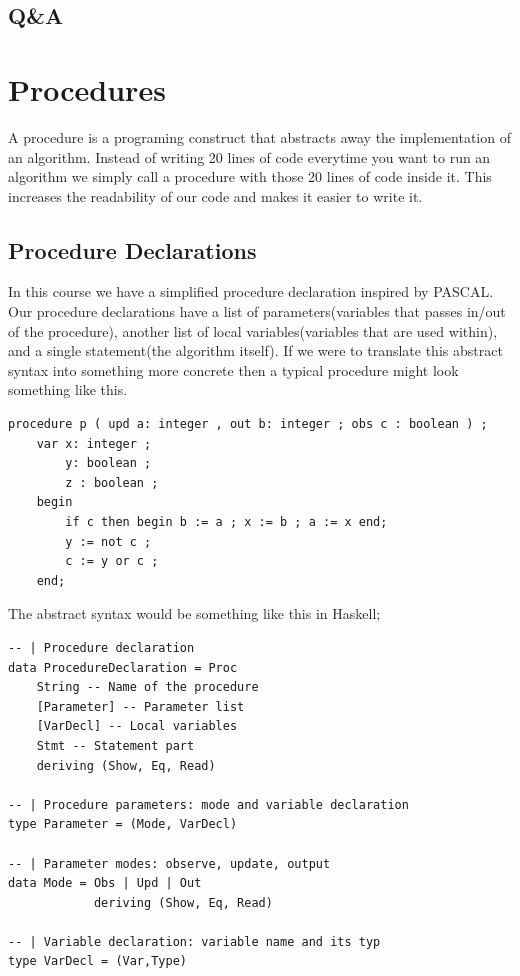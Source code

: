 \documentclass{article}
\begin{document}
        \subsection{Q\&A}

    \section{Procedures}
    A procedure is a programing construct that abstracts away the implementation of an algorithm. Instead of writing 20 lines of code 
    everytime you want to run an algorithm we simply call a procedure with those 20 lines of code inside it. This increases the readability 
    of our code and makes it easier to write it. 
    \subsection{Procedure Declarations}
    In this course we have a simplified procedure declaration inspired by PASCAL. Our procedure declarations have a list of 
    parameters(variables that passes in/out of the procedure), another list of local variables(variables that are used within), 
    and a single statement(the algorithm itself).
    If we were to translate this abstract syntax into something more concrete then a typical procedure might look something like this.
    \begin{lstlisting}
procedure p ( upd a: integer , out b: integer ; obs c : boolean ) ;
    var x: integer ;
        y: boolean ;
        z : boolean ;
    begin
        if c then begin b := a ; x := b ; a := x end;
        y := not c ;
        c := y or c ;
    end;
    \end{lstlisting}
    The abstract syntax would be something like this in Haskell;
    \begin{lstlisting}
-- | Procedure declaration
data ProcedureDeclaration = Proc
    String -- Name of the procedure
    [Parameter] -- Parameter list
    [VarDecl] -- Local variables
    Stmt -- Statement part
    deriving (Show, Eq, Read)

-- | Procedure parameters: mode and variable declaration
type Parameter = (Mode, VarDecl)

-- | Parameter modes: observe, update, output
data Mode = Obs | Upd | Out 
            deriving (Show, Eq, Read)

-- | Variable declaration: variable name and its typ
type VarDecl = (Var,Type)

    \end{lstlisting}
\end{document}
